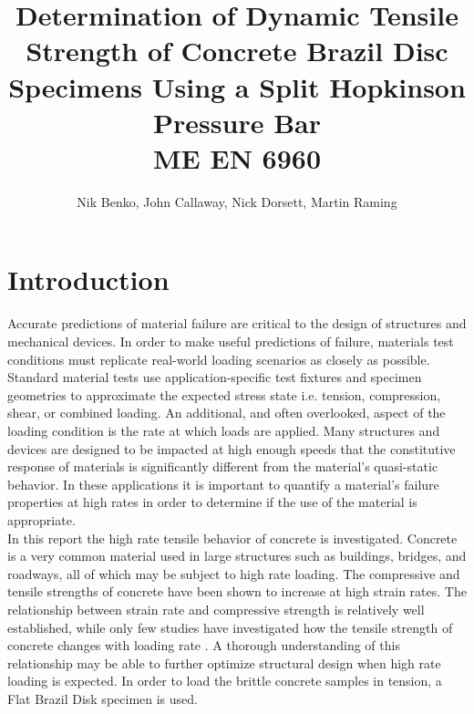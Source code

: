 \documentclass[12pt]{article}
\begin{document}
\title{ Determination of Dynamic Tensile Strength of Concrete Brazil Disc Specimens Using a Split Hopkinson Pressure Bar  \\ \normalsize{ME EN 6960}}
\author{Nik Benko, John Callaway, Nick Dorsett, Martin Raming}
\maketitle

\begin{abstract} 

\end{abstract}

\section{Introduction} %
Accurate predictions of material failure are critical to the design of structures and mechanical devices. In order to make useful predictions of failure, materials test conditions must replicate real-world loading scenarios as closely as possible. Standard material tests use application-specific test fixtures and specimen geometries to approximate the expected stress state i.e. tension, compression, shear, or combined loading. An additional, and often overlooked, aspect of the loading condition is the rate at which loads are applied. Many structures and devices are designed to be impacted at high enough speeds that the constitutive response of materials is significantly different from the material's quasi-static behavior. In these applications it is important to quantify a material’s failure properties at high rates in order to determine if the use of the material is appropriate.  \\

In this report the high rate tensile behavior of concrete is investigated. Concrete is a very common material used in large structures such as buildings, bridges, and roadways, all of which may be subject to high rate loading. The compressive and tensile strengths of concrete have been shown to increase at high strain rates. The relationship between strain rate and compressive strength is relatively well established, while only few studies have investigated how the tensile strength of concrete changes with loading rate \cite{Jin2017}. A thorough  understanding of this relationship may be able to further optimize structural design when high rate loading is expected. In order to load the brittle concrete samples in tension, a Flat Brazil Disk specimen is used.\\ 
\end{document}
